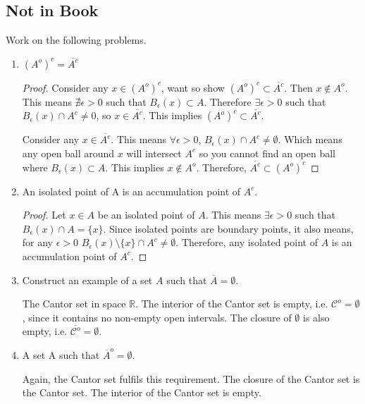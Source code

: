 \documentclass{tufte-book}
\theoremstyle{mytheoremstyle}
\theoremstyle{mylemstyle}
\theoremstyle{mydefstyle}
\begin{document}
\subsection{Not in Book}
Work on the following problems.

\begin{enumerate}
\item $(A^o)^c = \overline{A^c}$
\begin{proof}
Consider any $x \in (A^o)^c$, want so show $(A^o)^c \subset \overline{A^c}$.  Then $x \notin A^o$.  This means $\nexists \epsilon > 0$ such that $B_\epsilon(x) \subset A$.  Therefore $\exists\epsilon > 0$ such that $B_\epsilon(x) \cap A^c \neq 0$, so $x \in \overline{A^c}$.  This implies $(A^o)^c \subset \overline{A^c}$.

Consider any $x \in \overline{A^c}$.  This means $\forall\epsilon >0$, $B_\epsilon(x) \cap A^c \neq \emptyset$.  Which means any open ball around $x$ will intersect $A^c$ so you cannot find an open ball where $B_\epsilon(x) \subset A$.  This implies $x \notin A^o$.  Therefore, $\overline{A^c} \subset (A^o)^c$

\end{proof}

\item An isolated point of A is an accumulation point of $A^c$.

\begin{proof}
Let $x \in A$ be an isolated point of $A$.  This means $\exists\epsilon>0$ such that $B_\epsilon (x) \cap A = \{x\}$.  Since isolated points are boundary points,  it also means, for any $\epsilon >0$ $B_\epsilon(x)\setminus \{x\} \cap A^c \neq \emptyset$.  Therefore, any isolated point of $A$ is an accumulation point of $A^c$.

\end{proof}

\item Construct an example of a set $A$ such that $\overline{A} = \emptyset$.

The Cantor set in space $\mathbb{R}$.  The interior of the Cantor set is empty, i.e. $\mathcal{C}^o = \emptyset$, since it contains no non-empty open intervals.  The closure of $\emptyset$ is also empty, i.e. $\overline{\mathcal{C}^o} = \emptyset$.

\item A set A such that $\overline{A}^{o} = \emptyset$.

Again, the Cantor set fulfils this requirement.  The closure of the Cantor set is the Cantor set.  The interior of the Cantor set is empty.

\end{enumerate}
\end{document}
